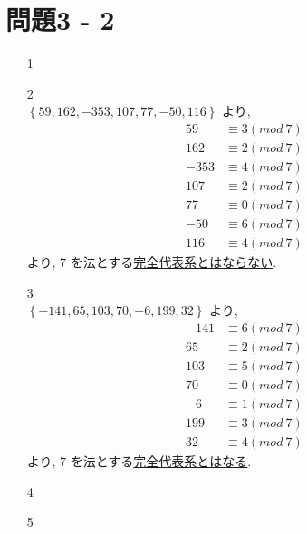 \documentclass[12pt,a4paper]{jsarticle}
\begin{document}
\section*{問題3 - 2}
\begin{enumerate}
 \item[1]  \mbox{} \\
 \item[2]  \mbox{} \\
 $\left\{ 59, 162, -353, 107, 77, -50, 116 \right\}$ より,
 \begin{align*}
 59 &\equiv 3 (mod~7) \\
 162 &\equiv 2 (mod~7) \\
 -353 &\equiv 4 (mod~7) \\
 107 &\equiv 2 (mod~7) \\
 77 &\equiv 0 (mod~7) \\
 -50 &\equiv 6 (mod~7) \\
 116 &\equiv 4 (mod~7) 
 \end{align*}
 より, $7$ を法とする\underline{完全代表系とはならない}.
 \item[3]  \mbox{} \\
 $\left\{ -141, 65, 103, 70, -6, 199, 32 \right\}$ より,
 \begin{align*}
 -141 &\equiv 6 (mod~7) \\
 65 &\equiv 2 (mod~7) \\
 103 &\equiv 5 (mod~7) \\
 70 &\equiv 0 (mod~7) \\
 -6 &\equiv 1 (mod~7) \\
 199 &\equiv 3 (mod~7) \\
 32 &\equiv 4 (mod~7) 
 \end{align*}
 より, $7$ を法とする\underline{完全代表系とはなる}.
 \item[4]  \mbox{} \\
 \item[5]  \mbox{} \\
\end{enumerate}
\pagebreak
\end{document}
